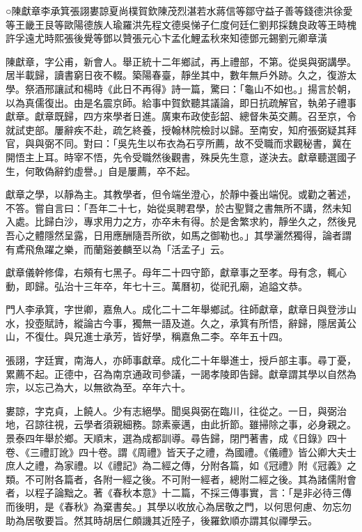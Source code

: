 
\begin{pinyinscope}
○陳獻章李承箕張詡婁諒夏尚樸賀欽陳茂烈湛若水蔣信等鄒守益子善等錢德洪徐愛等王畿王艮等歐陽德族人瑜羅洪先程文德吳悌子仁度何廷仁劉邦採魏良政等王時槐許孚遠尤時熙張後覺等鄧以贊張元心卞孟化鯉孟秋來知德鄧元錫劉元卿章潢

陳獻章，字公甫，新會人。舉正統十二年鄉試，再上禮部，不第。從吳與弼講學。居半載歸，讀書窮日夜不輟。築陽春臺，靜坐其中，數年無戶外跡。久之，復游太學。祭酒邢讓試和楊時《此日不再得》詩一篇，驚曰：「龜山不如也。」揚言於朝，以為真儒復出。由是名震京師。給事中賀欽聽其議論，即日抗疏解官，執弟子禮事獻章。獻章既歸，四方來學者日進。廣東布政使彭韶、總督朱英交薦。召至京，令就試吏部。屢辭疾不赴，疏乞終養，授翰林院檢討以歸。至南安，知府張弼疑其拜官，與與弼不同。對曰：「吳先生以布衣為石亨所薦，故不受職而求觀秘書，冀在開悟主上耳。時宰不悟，先令受職然後觀書，殊戾先生意，遂決去。獻章聽選國子生，何敢偽辭釣虛譽。」自是屢薦，卒不起。

獻章之學，以靜為主。其教學者，但令端坐澄心，於靜中養出端倪。或勸之著述，不答。嘗自言曰：「吾年二十七，始從吳聘君學，於古聖賢之書無所不講，然未知入處。比歸白沙，專求用力之方，亦卒未有得。於是舍繁求約，靜坐久之，然後見吾心之體隱然呈露，日用應酬隨吾所欲，如馬之御勒也。」其學灑然獨得，論者謂有鳶飛魚躍之樂，而蘭谿姜麟至以為「活孟子」云。

獻章儀幹修偉，右頰有七黑子。母年二十四守節，獻章事之至孝。母有念，輒心動，即歸。弘治十三年卒，年七十三。萬曆初，從祀孔廟，追謚文恭。

門人李承箕，字世卿，嘉魚人。成化二十二年舉鄉試。往師獻章，獻章日與登涉山水，投壺賦詩，縱論古今事，獨無一語及道。久之，承箕有所悟，辭歸，隱居黃公山，不復仕。與兄進士承芳，皆好學，稱嘉魚二李。卒年五十四。

張詡，字廷實，南海人，亦師事獻章。成化二十年舉進士，授戶部主事。尋丁憂，累薦不起。正德中，召為南京通政司參議，一謁孝陵即告歸。獻章謂其學以自然為宗，以忘己為大，以無欲為至。卒年六十。

婁諒，字克貞，上饒人。少有志絕學。聞吳與弼在臨川，往從之。一日，與弼治地，召諒往視，云學者須親細務。諒素豪邁，由此折節。雖掃除之事，必身親之。景泰四年舉於鄉。天順末，選為成都訓導。尋告歸，閉門著書，成《日錄》四十卷、《三禮訂訛》四十卷。謂《周禮》皆天子之禮，為國禮。《儀禮》皆公卿大夫士庶人之禮，為家禮。以《禮記》為二經之傳，分附各篇，如《冠禮》附《冠義》之類。不可附各篇者，各附一經之後。不可附一經者，總附二經之後。其為諸儒附會者，以程子論黜之。著《春秋本意》十二篇，不採三傳事實，言：「是非必待三傳而後明，是《春秋》為棄書矣。」其學以收放心為居敬之門，以何思何慮、勿忘勿助為居敬要旨。然其時胡居仁頗譏其近陸子，後羅欽順亦謂其似禪學云。


\end{pinyinscope}
